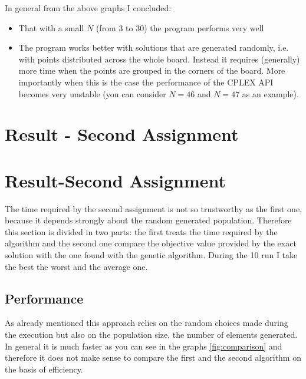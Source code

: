 In general from the above graphs I concluded:
\begin{itemize}
	\item That with a small $N$ (from 3 to 30) the program performs very well
	\item The program works better with solutions that are generated randomly, i.e. with points distributed 
	across the whole board. Instead it requires (generally) more time when the points are grouped
	in the corners of the board. More importantly when this is the case the performance of the CPLEX
	API becomes very unstable (you can consider $N = 46$ and $N=47$ as an example).
\end{itemize}
\newpage


\section{Result - Second Assignment}



\section{Result-Second Assignment}
The time required by the second assignment is not so  trustworthy 
as the first one, because it depends strongly about the random
generated population. Therefore this section is divided in two
parts: the first treats the time required by the algorithm and
the second one compare the objective value provided by the exact
solution with the one found with the genetic algorithm. During the
10 run I take the best the worst and the average one.
\subsection{Performance}
As already mentioned this approach relies on the random choices made during the execution but 
also on the population size, the number of elements generated.
In general it is much faster as you can see in the graphs \ref{fig:comparison}
and therefore it does not make sense to compare the first and the second
algorithm on the basis of efficiency.

